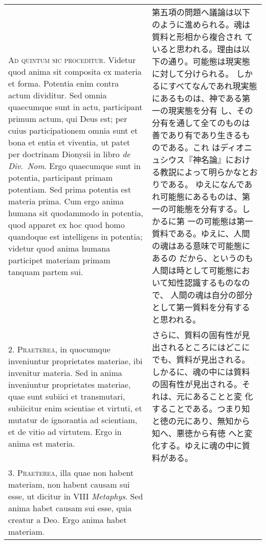 \documentclass[10pt]{jsarticle} %
\begin{document}
\begin{longtable}{p{21em}p{21em}}

{\scshape Ad quintum sic proceditur}. Videtur quod anima sit composita
ex materia et forma. Potentia enim contra actum dividitur. Sed omnia
quaecumque sunt in actu, participant primum actum, qui Deus est; per
cuius participationem omnia sunt et bona et entia et viventia, ut
patet per doctrinam Dionysii in libro {\itshape de Div.~Nom}. Ergo quaecumque
sunt in potentia, participant primam potentiam. Sed prima potentia est
materia prima. Cum ergo anima humana sit quodammodo in potentia, quod
apparet ex hoc quod homo quandoque est intelligens in potentia;
videtur quod anima humana participet materiam primam tanquam partem
sui.


&

第五項の問題へ議論は以下のように進められる。魂は質料と形相から複合され
ていると思われる。理由は以下の通り。可能態は現実態に対して分けられる。
しかるにすべてなんであれ現実態にあるものは、神である第一の現実態を分有
し、その分有を通して全てのものは善であり有であり生きるものである。これ
はディオニュシウス『神名論』における教説によって明らかなとおりである。
ゆえになんであれ可能態にあるものは、第一の可能態を分有する。しかるに第
一の可能態は第一質料である。ゆえに、人間の魂はある意味で可能態にあるの
だから、というのも人間は時として可能態において知性認識するものなので、
人間の魂は自分の部分として第一質料を分有すると思われる。

\\



2. {\scshape Praeterea}, in quocumque inveniuntur proprietates
materiae, ibi invenitur materia. Sed in anima inveniuntur proprietates
materiae, quae sunt subiici et transmutari, subiicitur enim scientiae
et virtuti, et mutatur de ignorantia ad scientiam, et de vitio ad
virtutem. Ergo in anima est materia.


&

さらに、質料の固有性が見出されるところにはどこにでも、質料が見出される。
しかるに、魂の中には質料の固有性が見出される。それは、元にあることと変
 化することである。つまり知と徳の元にあり、無知から知へ、悪徳から有徳
 へと変化する。ゆえに魂の中に質料がある。

\\



3. {\scshape Praeterea}, illa quae non habent materiam, non habent
causam sui esse, ut dicitur in VIII {\itshape Metaphys}. Sed anima habet causam
sui esse, quia creatur a Deo. Ergo anima habet materiam.



\end{longtable}
\end{document}

